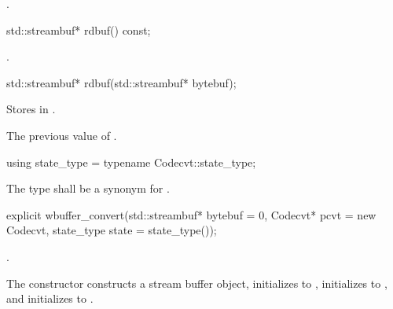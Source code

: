 \begin{itemdescr}
\pnum
\returns {}.
\end{itemdescr}

%
%
\begin{itemdecl}
std::streambuf* rdbuf() const;
\end{itemdecl}

\begin{itemdescr}
\pnum
\returns {}.
\end{itemdescr}

%
%
\begin{itemdecl}
std::streambuf* rdbuf(std::streambuf* bytebuf);
\end{itemdecl}

\begin{itemdescr}
\pnum
\effects Stores  in .

\pnum
\returns The previous value of .
\end{itemdescr}

%
%
\begin{itemdecl}
using state_type = typename Codecvt::state_type;
\end{itemdecl}

\begin{itemdescr}
\pnum
The type shall be a synonym for .
\end{itemdescr}

%
\begin{itemdecl}
explicit wbuffer_convert(std::streambuf* bytebuf = 0,
    Codecvt* pcvt = new Codecvt, state_type state = state_type());
\end{itemdecl}

\begin{itemdescr}
\pnum
\requires
{}.

\pnum
\effects The constructor constructs a stream buffer object, initializes
 to , initializes 
to , and initializes  to .
\end{itemdescr}

